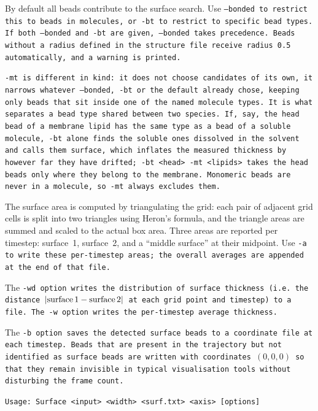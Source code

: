\vspace{1em}
By default all beads contribute to the surface search. Use \tt{--bonded} to
restrict this to beads in molecules, or \tt{-bt} to restrict to specific bead
types. If both \tt{--bonded} and \tt{-bt} are given, \tt{--bonded} takes
precedence. Beads without a radius defined in the structure file receive radius
0.5 automatically, and a warning is printed.

\tt{-mt} is different in kind: it does not choose candidates of its own, it
narrows whatever \tt{--bonded}, \tt{-bt} or the default already chose, keeping
only beads that sit inside one of the named molecule types. It is what
separates a bead type shared between two species. If, say, the head bead of a
membrane lipid has the same type as a bead of a soluble molecule, \tt{-bt}
alone finds the soluble ones dissolved in the solvent and calls them surface,
which inflates the measured thickness by however far they have drifted;
\tt{-bt <head> -mt <lipids>} takes the head beads only where they belong to
the membrane. Monomeric beads are never in a molecule, so \tt{-mt} always
excludes them.

The surface area is computed by triangulating the grid: each pair of adjacent
grid cells is split into two triangles using Heron's formula, and the triangle
areas are summed and scaled to the actual box area. Three areas are reported per
timestep: surface~1, surface~2, and a \enquote{middle surface} at their midpoint.
Use \tt{-a} to write these per-timestep areas; the overall averages are appended
at the end of that file.

The \tt{-wd} option writes the distribution of surface thickness (i.e.\ the
distance $|\text{surface\,1} - \text{surface\,2}|$ at each grid point and
timestep) to a file. The \tt{-w} option writes the per-timestep average
thickness. 

The \tt{-b} option saves the detected surface beads to a coordinate file at each
timestep. Beads that are present in the trajectory but not identified as surface
beads are written with coordinates $(0, 0, 0)$ so that they remain invisible in
typical visualisation tools without disturbing the frame count.

\noindent
\tt{Usage: Surface <input> <width> <surf.txt> <axis> [options]}

